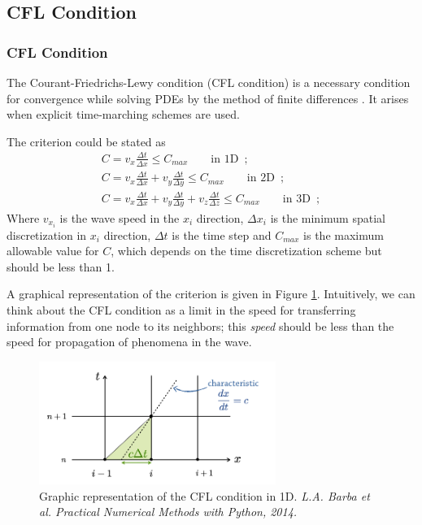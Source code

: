 \documentclass{beamer}
\begin{document}
\subsection{CFL Condition}
\begin{frame}[allowframebreaks]
\frametitle{CFL Condition}
\justifying
The Courant-Friedrichs-Lewy condition (CFL condition) is a necessary
condition for convergence while solving PDEs by the method of finite
differences \cite{CFL}. It arises when explicit time-marching schemes are used.

The criterion could be stated as 
\begin{align*}
C=v_{x}\frac{\Delta t}{\Delta x}\leq C_{max}\qquad\mbox{in 1D}\enspace;\\
C=v_{x}\frac{\Delta t}{\Delta x}+v_{y}\frac{\Delta t}{\Delta y}\leq C_{max}\qquad\mbox{in 2D}\enspace;\\
C=v_{x}\frac{\Delta t}{\Delta x}+v_{y}\frac{\Delta t}{\Delta y}+v_{z}\frac{\Delta t}{\Delta z}\leq C_{max}\qquad\mbox{in 3D}\enspace;
\end{align*}
 Where $v_{x_{i}}$ is the wave speed in the
$x_{i}$ direction, $\Delta x_{i}$ is the minimum spatial discretization
in $x_{i}$ direction, $\Delta t$ is the time step and $C_{max}$
is the maximum allowable value for $C$, which depends on the time
discretization scheme but should be less than 1.

A graphical representation of the criterion is given in Figure \ref{fig:CFL}. Intuitively, we can think about the CFL condition as a limit in the speed for transferring information from one node to its neighbors; this \emph{speed} should be less than the speed for propagation of phenomena in the wave. 
\begin{figure}
\centering
\includegraphics[height=4cm]{img/CFLcondition.png} 
\caption{Graphic representation of the CFL condition in 1D. \textit{L.A. Barba et al. Practical Numerical Methods with Python, 2014.}}\label{fig:CFL}
\end{figure}


\end{frame}
\end{document}
